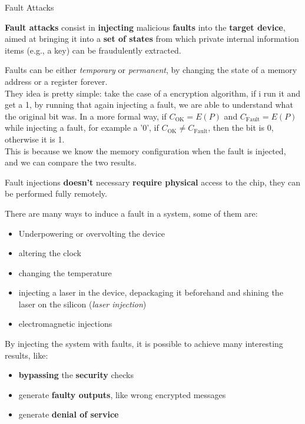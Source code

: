 \begin{chapter}{Fault Attacks}
  \begin{boxH}
    \textbf{Fault attacks} consist in \textbf{injecting} malicious \textbf{faults} into the
    \textbf{target device}, aimed at bringing it into a \textbf{set of states} from which private
    internal information items (e.g., a key) can be fraudulently extracted.
  \end{boxH}
  Faults can be either \textit{temporary} or \textit{permanent}, by changing the state of a memory
  address or a register forever.\\
  They idea is pretty simple: take the case of a encryption algorithm, if i run it and get a 1, by
  running that again injecting a fault, we are able to understand what the original bit was. In a
  more formal way, if $C_{\text{OK}}=E(P)$ and $C_{\text{Fault}}=E(P)$ while injecting a fault, for
  example a '0', if $C_{\text{OK}} \neq C_{\text{Fault}}$, then the bit is 0, otherwise it is 1.\\
  This is because we know the memory configuration when the fault is injected, and we can compare 
  the two results.

  \begin{boxH}
    Fault injections \textbf{doesn't} necessary \textbf{require physical} access to the chip, they
    can be performed fully remotely.
  \end{boxH}

  There are many ways to induce a fault in a system, some of them are:
  \begin{itemize}
    \item Underpowering or overvolting the device
    \item altering the clock
    \item changing the temperature
    \item injecting a laser in the device, depackaging it beforehand and shining the laser on the
      silicon (\textit{laser injection})
    \item electromagnetic injections
  \end{itemize}

  By injecting the system with faults, it is possible to achieve many interesting results, like:
  \begin{itemize}
    \item \textbf{bypassing} the \textbf{security} checks
    \item generate \textbf{faulty outputs}, like wrong encrypted messages
    \item generate \textbf{denial of service}
  \end{itemize}
  

\end{chapter}
